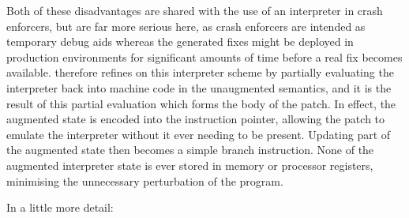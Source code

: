 Both of these disadvantages are shared with the use of an interpreter
in crash enforcers, but are far more serious here, as crash enforcers
are intended as temporary debug aids whereas the generated fixes might
be deployed in production environments for significant amounts of time
before a real fix becomes available.  {\Technique} therefore refines
on this interpreter scheme by partially evaluating the
interpreter\needCite{} back into machine code in the unaugmented
semantics, and it is the result of this partial evaluation which forms
the body of the patch.  In effect, the augmented state is encoded into
the instruction pointer, allowing the patch to emulate the interpreter
without it ever needing to be present.  Updating part of the augmented
state then becomes a simple branch instruction.  None of the augmented
interpreter state is ever stored in memory or processor registers,
minimising the unnecessary perturbation of the program.

In a little more detail:

